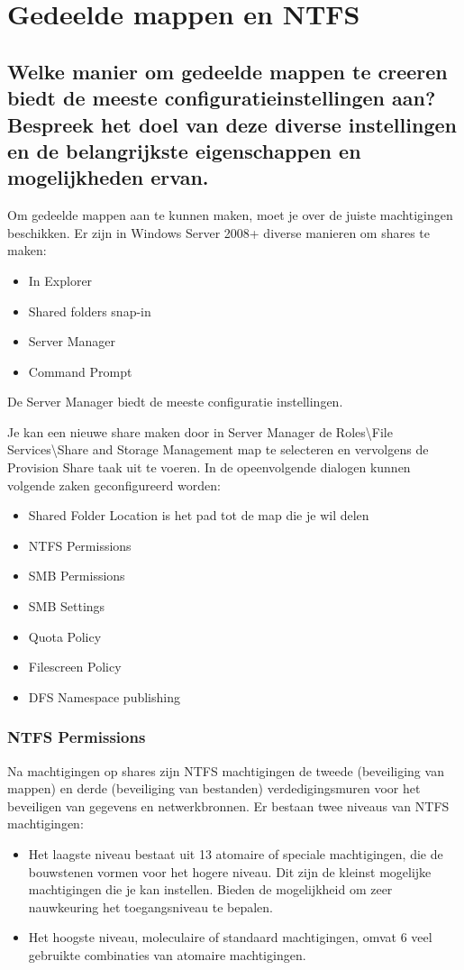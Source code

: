 \chapter{Gedeelde mappen en NTFS}

\section{Welke manier om gedeelde mappen te creeren biedt de meeste
configuratieinstellingen aan? Bespreek het doel van deze diverse instellingen en
de belangrijkste eigenschappen en mogelijkheden ervan.}

Om gedeelde mappen aan te kunnen maken, moet je over de juiste machtigingen
beschikken. Er zijn in Windows Server 2008+ diverse manieren om shares te maken:
\begin{itemize}
	\item In Explorer
	\item Shared folders snap-in
	\item Server Manager
	\item Command Prompt
\end{itemize}

De Server Manager biedt de meeste configuratie instellingen.

Je kan een nieuwe share maken door in Server Manager de Roles\textbackslash File
Services\textbackslash Share and Storage Management map te selecteren en
vervolgens de Provision Share taak uit te voeren. In de opeenvolgende dialogen
kunnen volgende zaken geconfigureerd worden:
\begin{itemize}
	\item Shared Folder Location is het pad tot de map die je wil delen
	\item NTFS Permissions
	\item SMB Permissions
	\item SMB Settings
	\item Quota Policy
	\item Filescreen Policy
	\item DFS Namespace publishing
\end{itemize}

\subsection{NTFS Permissions}

Na machtigingen op shares zijn NTFS machtigingen de tweede (beveiliging van
mappen) en derde (beveiliging van bestanden) verdedigingsmuren voor het
beveiligen van gegevens en netwerkbronnen. Er bestaan twee niveaus van NTFS
machtigingen:
\begin{itemize}
	\item Het laagste niveau bestaat uit 13 atomaire of speciale
		machtigingen, die de bouwstenen vormen voor het hogere niveau.
		Dit zijn de kleinst mogelijke machtigingen die je kan instellen.
		Bieden de mogelijkheid om zeer nauwkeuring het toegangsniveau te
		bepalen.
	\item Het hoogste niveau, moleculaire of standaard machtigingen, omvat 6
		veel gebruikte combinaties van atomaire machtigingen.
\end{itemize}

